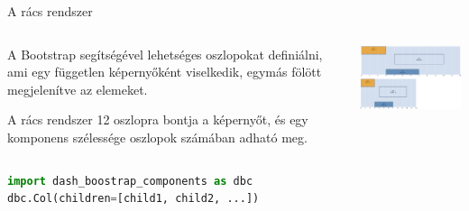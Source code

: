 \documentclass[english, aspectratio=169]{beamer}
\begin{document}
\begin{frame}[fragile]{A rács rendszer}
	\begin{columns}
		\begin{column}{.5\textwidth}
			A Bootstrap segítségével lehetséges oszlopokat definiálni, ami egy független képernyőként viselkedik, egymás fölött megjelenítve az elemeket.\par\medskip
			A rács rendszer 12 oszlopra bontja a képernyőt, és egy komponens szélessége oszlopok számában adható meg. 
		\end{column}
		\begin{column}{.6\textwidth}
			\begin{center}
				\includegraphics[width=7cm, keepaspectratio]{images/dash_9.png}
			\end{center}
		\end{column}
	\end{columns}
	\vspace{0.2cm}
	\begin{center}
		\begin{lstlisting}[language=python]
import dash_boostrap_components as dbc
dbc.Col(children=[child1, child2, ...])
		\end{lstlisting}
	\end{center}
\end{frame}
\end{document}
